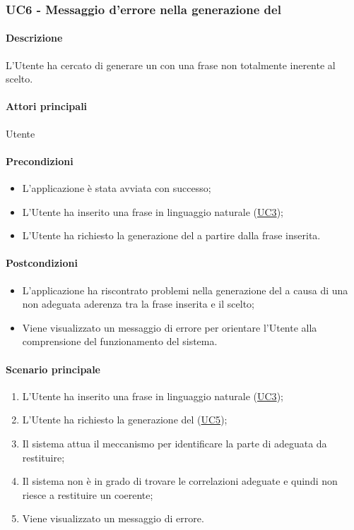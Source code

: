\subsubsection{UC6 - Messaggio d'errore nella generazione del }\label{UC6}
\paragraph*{Descrizione}
L’Utente ha cercato di generare un  con una frase non totalmente inerente al  scelto.

\paragraph*{Attori principali}
Utente

\paragraph*{Precondizioni}
\begin{itemize}
  \item L'applicazione è stata avviata con successo;
  \item L’Utente ha inserito una frase in linguaggio naturale (\hyperref[UC3]{UC3});
  \item L’Utente ha richiesto la generazione del  a partire dalla frase inserita.  
\end{itemize}

\paragraph*{Postcondizioni}
\begin{itemize}
  \item L’applicazione ha riscontrato problemi nella generazione del  a causa di una non adeguata aderenza tra la frase inserita e il  scelto;
  \item Viene visualizzato un messaggio di errore per orientare l’Utente alla comprensione del funzionamento del sistema.
\end{itemize}

\paragraph*{Scenario principale}
\begin{enumerate}
  \item L’Utente ha inserito una frase in linguaggio naturale (\hyperref[UC3]{UC3});
  \item L'Utente ha richiesto la generazione del  (\hyperref[UC5]{UC5});
  \item Il sistema attua il meccanismo per identificare la parte di  adeguata da restituire;
  \item Il sistema non è in grado di trovare le correlazioni adeguate e quindi non riesce a restituire un  coerente;
  \item Viene visualizzato un messaggio di errore.
\end{enumerate}
